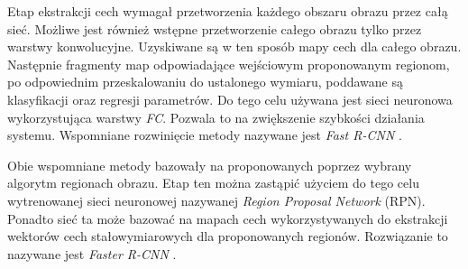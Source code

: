 Etap ekstrakcji cech wymagał przetworzenia każdego obszaru obrazu przez całą sieć.
Możliwe jest również wstępne przetworzenie całego obrazu tylko przez warstwy konwolucyjne.
Uzyskiwane są w ten sposób mapy cech dla całego obrazu.
Następnie fragmenty map odpowiadające wejściowym proponowanym regionom, po odpowiednim przeskalowaniu do ustalonego wymiaru, poddawane są klasyfikacji oraz regresji parametrów.
Do tego celu używana jest sieci neuronowa wykorzystująca warstwy \emph{FC}.
Pozwala to na zwiększenie szybkości działania systemu.
Wspomniane rozwinięcie metody nazywane jest \emph{Fast R-CNN} \cite{fast_rcnn}.

Obie wspomniane metody bazowały na proponowanych poprzez wybrany algorytm regionach obrazu.
Etap ten można zastąpić użyciem do tego celu wytrenowanej sieci neuronowej nazywanej \emph{Region Proposal Network} (RPN).
Ponadto sieć ta może bazować na mapach cech wykorzystywanych do ekstrakcji wektorów cech stałowymiarowych  dla proponowanych regionów. 
Rozwiązanie to nazywane jest \emph{Faster R-CNN} \cite{faster_rcnn}.
